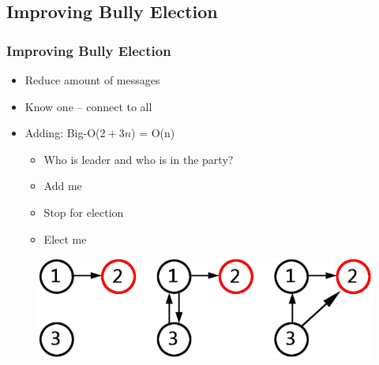 \documentclass{beamer}
\begin{document}
\subsection{Improving Bully Election}
	\begin{frame}
		\frametitle{Improving Bully Election}
		
		\begin{itemize}
		\item Reduce amount of messages
		\item Know one -- connect to all
		\item Adding: Big-O($2+3n$) = O(n)
		
			\begin{itemize}
			\item Who is leader and who is in the party?
			\item Add me
			\item Stop for election
			\item Elect me
			\end{itemize}
		
		\end{itemize}
		
		\begin{figure}[hbtp]
		\centering
		\includegraphics[scale=0.4]{RMI-Smart-Election}
		\end{figure}		

	\end{frame}
\end{document}

